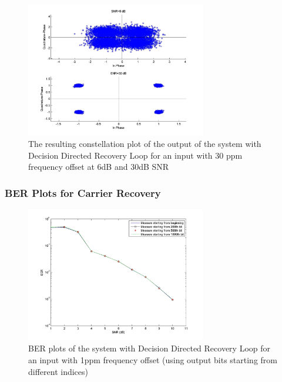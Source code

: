 \documentclass[]{article}
\begin{document}
\begin{figure}[H]
\centering
\hspace*{-2cm}\includegraphics[width=0.7\textwidth]{qpConstfo_ddr2.jpg}
\caption{The resulting constellation plot of the output of the system with Decision Directed Recovery Loop for an input with 30 ppm frequency offset at 6dB and 30dB SNR }
\end{figure}


\subsubsection{BER Plots for Carrier Recovery}
\begin{figure}[H]
\centering
\hspace*{-2cm}\includegraphics[width=0.7\textwidth]{qpBERfo_ddr1.jpg}
\caption{BER plots of the system with Decision Directed Recovery Loop for an input with 1ppm frequency offset (using output bits starting from different indices)}
\end{figure}
\end{document}
